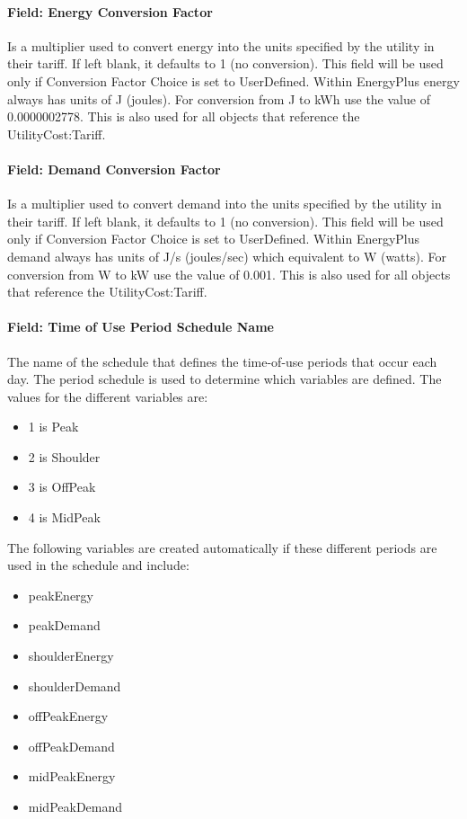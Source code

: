 \paragraph{Field: Energy Conversion Factor}\label{field-energy-conversion-factor}

Is a multiplier used to convert energy into the units specified by the utility in their tariff. If left blank, it defaults to 1 (no conversion). This field will be used only if Conversion Factor Choice is set to UserDefined. Within EnergyPlus energy always has units of J (joules). For conversion from J to kWh use the value of 0.0000002778. This is also used for all objects that reference the UtilityCost:Tariff.

\paragraph{Field: Demand Conversion Factor}\label{field-demand-conversion-factor}

Is a multiplier used to convert demand into the units specified by the utility in their tariff. If left blank, it defaults to 1 (no conversion). This field will be used only if Conversion Factor Choice is set to UserDefined. Within EnergyPlus demand always has units of J/s (joules/sec) which equivalent to W (watts). For conversion from W to kW use the value of 0.001. This is also used for all objects that reference the UtilityCost:Tariff.

\paragraph{Field: Time of Use Period Schedule Name}\label{field-time-of-use-period-schedule-name}

The name of the schedule that defines the time-of-use periods that occur each day. The period schedule is used to determine which variables are defined. The values for the different variables are:

\begin{itemize}
\item
  1 is Peak
\item
  2 is Shoulder
\item
  3 is OffPeak
\item
  4 is MidPeak
\end{itemize}

The following variables are created automatically if these different periods are used in the schedule and include:

\begin{itemize}
\item
  peakEnergy
\item
  peakDemand
\item
  shoulderEnergy
\item
  shoulderDemand
\item
  offPeakEnergy
\item
  offPeakDemand
\item
  midPeakEnergy
\item
  midPeakDemand
\end{itemize}

